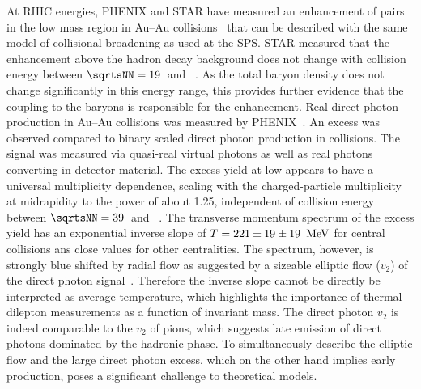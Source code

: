 \documentclass[../report.tex]{subfiles}
\begin{document}
At RHIC energies, PHENIX and STAR have measured an enhancement of \Pepem pairs in the low mass region in Au--Au collisions~\cite{Adare:2009qk,Adare:2015ila,Adamczyk:2013caa,Adamczyk:2015mmx} that can be described with the same model of collisional broadening as used at the SPS. STAR measured that the enhancement above the hadron decay background does not change with collision energy between $\sqrtsNN=\unit[19]{}$ and \unit[200]{\UGeV}~\cite{Adamczyk:2015mmx}. As the total baryon density does not change significantly in this energy range, this provides further evidence that the \PGr coupling to the baryons is responsible for the enhancement. 
Real direct photon production in Au--Au collisions was measured by PHENIX~\cite{Adare:2008ab,Adare:2014fwh,Adare:2018wgc}. An excess was observed compared to binary scaled direct photon production in \pp{} collisions. The signal was measured via quasi-real virtual photons as well as real photons converting in detector material. The excess yield at low \pT{} appears to have a universal multiplicity dependence, scaling with the charged-particle multiplicity at midrapidity to the power of about 1.25, independent of collision energy between $\sqrtsNN = \unit[39]{}$ and \unit[200]{\UGeV}~\cite{Adare:2018wgc}. The transverse momentum spectrum of the excess yield has an exponential inverse slope of $T=\unit[221\pm19\pm19]{\UMeV}$ for central collisions ans close values for other centralities. The spectrum, however, is strongly blue shifted by radial flow as suggested by a sizeable elliptic flow ($v_2$) of the direct photon signal~\cite{Adare:2011zr}. Therefore the inverse slope cannot be directly be interpreted as average temperature, which highlights the importance of thermal dilepton measurements as a function of invariant mass. The direct photon $v_2$ is indeed comparable to the $v_2$ of pions, which suggests late emission of direct photons dominated by the hadronic phase. To simultaneously describe the elliptic flow and the large direct photon excess, which on the other hand implies early production, poses a significant challenge to theoretical models.
\end{document}
